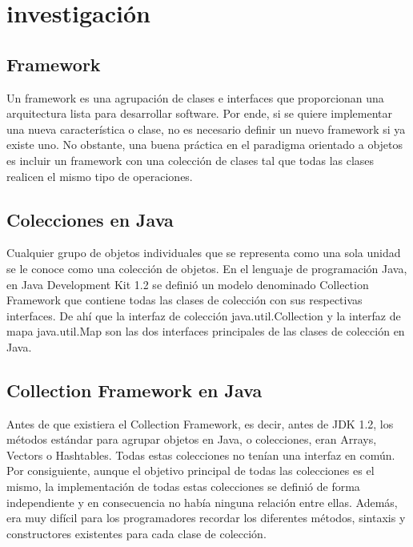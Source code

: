 \documentclass{report}
\begin{document}
    \section*{investigación}
      \subsection*{Framework}
      Un framework es una agrupación de clases e interfaces que proporcionan una arquitectura lista para desarrollar software. Por ende, si se quiere implementar una nueva característica o clase, no es necesario definir un nuevo framework si ya existe uno. No obstante, una buena práctica en el paradigma orientado a objetos es incluir un framework con una colección de clases tal que todas las clases realicen el mismo tipo de operaciones.
      \subsection*{Colecciones en Java}
      Cualquier grupo de objetos individuales que se representa como una sola unidad se le conoce como una colección de objetos. En el lenguaje de programación Java, en Java Development Kit 1.2 se definió un modelo denominado Collection Framework que contiene todas las clases de colección con sus respectivas interfaces. De ahí que la interfaz de colección java.util.Collection y la interfaz de mapa java.util.Map son las dos interfaces principales de las clases de colección en Java.
      \subsection*{Collection Framework en Java}
      Antes de que existiera el Collection Framework, es decir, antes de JDK 1.2, los métodos estándar para agrupar objetos en Java, o colecciones, eran Arrays, Vectors o Hashtables. Todas estas colecciones no tenían una interfaz en común. Por consiguiente, aunque el objetivo principal de todas las colecciones es el mismo, la implementación de todas estas colecciones se definió de forma independiente y en consecuencia no había ninguna relación entre ellas. Además, era muy difícil para los programadores recordar los diferentes métodos, sintaxis y constructores existentes para cada clase de colección.
\end{document}
